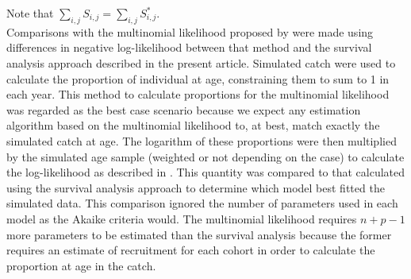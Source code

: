 Note that $\sum_{i,j} S_{i,j} = \sum_{i,j} S^{*}_{i,j}$.\\


Comparisons with the multinomial likelihood proposed by \cite{Four82a} were made using differences in negative log-likelihood between that method and the survival analysis approach described in the present article. Simulated catch were used to calculate the proportion of individual at age, constraining them to sum to 1 in each year. This method to calculate proportions for the multinomial likelihood was regarded as the best case scenario because we expect any estimation algorithm based on the multinomial likelihood to, at best, match exactly the simulated catch at age. The logarithm of these proportions were then multiplied by the simulated age sample (weighted or not depending on the case) to calculate the log-likelihood as described in \cite{Four82a}. This quantity was compared to that calculated using the survival analysis approach to determine which model best fitted the simulated data. This comparison ignored the number of parameters used in each model as the Akaike criteria would. The multinomial likelihood requires $n+p-1$ more parameters to be estimated than the survival analysis because the former requires an estimate of recruitment for each cohort in order to calculate the proportion at age in the catch.
